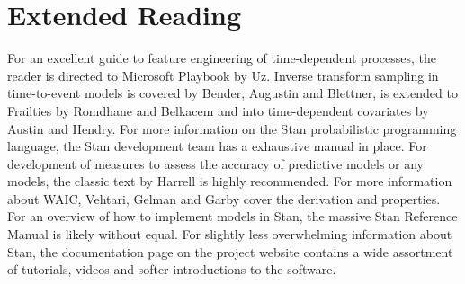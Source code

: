














\section*{Extended Reading}

For an excellent guide to feature engineering of time-dependent processes, the reader is directed to Microsoft Playbook by Uz\cite{Uz2016}. Inverse transform sampling in time-to-event models is covered by Bender, Augustin and Blettner\cite{Bender2005}, is extended to Frailties by Romdhane and Belkacem\cite{Romdhane2015} and into time-dependent covariates by Austin\cite{Austin2012} and Hendry\cite{Hendry2014}. For more information on the Stan probabilistic programming language, the Stan development team has a exhaustive manual in place\cite{StanDevelopmentTeam2016}. For development of measures to assess the accuracy of predictive models or any models, the classic text by Harrell is highly recommended\cite{Harrell2001}. For more information about WAIC, Vehtari, Gelman and Garby cover the derivation and properties\cite{Vehtari2015}. For an overview of how to implement models in Stan, the massive Stan Reference Manual is likely without equal\cite{StanDevelopmentTeam2016}. For slightly less overwhelming information about Stan, the documentation page on the project website contains a wide assortment of tutorials, videos and softer introductions to the software\cite{StanDevelopmentTeam2016a}.


